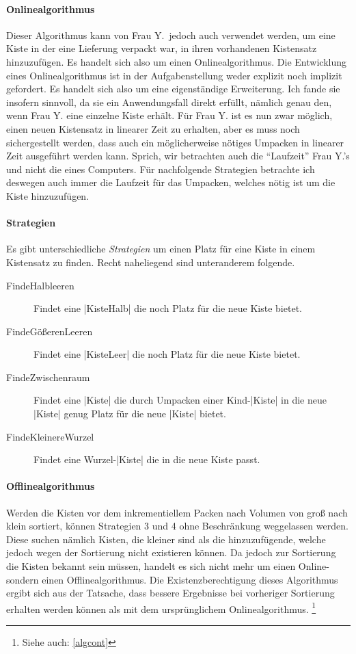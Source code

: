 \paragraph{Onlinealgorithmus}
Dieser Algorithmus kann von Frau Y.\ jedoch auch verwendet werden, um eine Kiste in der eine Lieferung verpackt war,
in ihren vorhandenen Kistensatz hinzuzufügen.
Es handelt sich also um einen Onlinealgorithmus. Die Entwicklung eines Onlinealgorithmus ist in der Aufgabenstellung weder explizit noch implizit gefordert.
Es handelt sich also um eine eigenständige Erweiterung.
Ich fande sie insofern sinnvoll, da sie ein Anwendungsfall direkt erfüllt, nämlich genau den, wenn Frau Y. eine einzelne Kiste erhält.
Für Frau Y. ist es nun zwar möglich, einen neuen Kistensatz in linearer Zeit zu erhalten, aber es muss noch sichergestellt werden,
dass auch ein möglicherweise nötiges Umpacken in linearer Zeit ausgeführt werden kann.
Sprich, wir betrachten auch die ``Laufzeit'' Frau Y.'s und nicht die eines Computers.
Für nachfolgende Strategien betrachte ich deswegen auch immer die Laufzeit für das Umpacken, welches nötig ist um die Kiste hinzuzufügen.
\lstset{basicstyle=}
\paragraph{Strategien}
Es gibt unterschiedliche \emph{Strategien} um einen Platz für eine Kiste in einem Kistensatz zu finden.
Recht naheliegend sind unteranderem folgende. \\
\begin{center}
\begin{minipage}{.9\textwidth}
\begin{description}
 \item[FindeHalbleeren] Findet eine |KisteHalb| die noch Platz für die neue Kiste bietet.
 \item[FindeGößerenLeeren] Findet eine |KisteLeer| die noch Platz für die neue Kiste bietet.
 \item[FindeZwischenraum] Findet eine |Kiste| die durch Umpacken einer Kind-|Kiste| in die neue |Kiste| genug Platz für die neue |Kiste| bietet.
 \item[FindeKleinereWurzel] Findet eine Wurzel-|Kiste| die in die neue Kiste passt.
\end{description}
\end{minipage}
\end{center}
\paragraph{Offlinealgorithmus}
Werden die Kisten vor dem inkrementiellem Packen nach Volumen von groß nach klein sortiert, können Strategien 3 und 4 ohne Beschränkung weggelassen werden.
Diese suchen nämlich Kisten, die kleiner sind als die hinzuzufügende, welche jedoch wegen der Sortierung nicht existieren können.
Da jedoch zur Sortierung die Kisten bekannt sein müssen, handelt es sich nicht mehr um einen Online- sondern einen Offlinealgorithmus.
Die Existenzberechtigung dieses Algorithmus ergibt sich aus der Tatsache, dass bessere Ergebnisse bei vorheriger Sortierung erhalten werden können
als mit dem ursprünglichem Onlinealgorithmus. \footnote{Siehe auch: \ref{algcont}}
